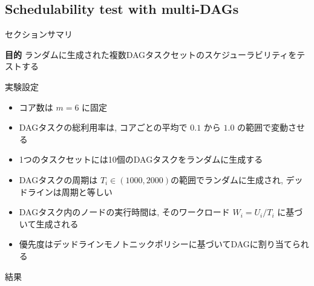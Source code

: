 \subsection{Schedulability test with multi-DAGs}
\label{ssec: Schedulability test with multi-DAGs}

\begin{frame}{セクションサマリ}
    \begin{itembox}[l]{\textbf{目的}}
        ランダムに生成された複数DAGタスクセットのスケジューラビリティをテストする
    \end{itembox}
\end{frame}

\begin{frame}{実験設定}
    \begin{itemize}
        \item コア数は $m=6$ に固定
        \item DAGタスクの総利用率は, コアごとの平均で $0.1$ から $1.0$ の範囲で変動させる
        \item 1つのタスクセットには10個のDAGタスクをランダムに生成する
        \item DAGタスクの周期は $T_{i} \in(1000,2000)$の範囲でランダムに生成され, デッドラインは周期と等しい
        \item DAGタスク内のノードの実行時間は, そのワークロード $W_{i}=U_{i} / T_{i}$ に基づいて生成される
        \item 優先度はデッドラインモノトニックポリシーに基づいてDAGに割り当てられる
    \end{itemize}
\end{frame}

\begin{frame}{結果}
\end{frame}
